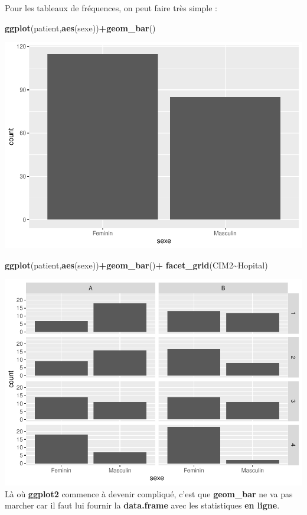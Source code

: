 \documentclass[
]{book}
\newenvironment{Shaded}{\begin{snugshade}}{\end{snugshade}}
\newcommand{\FunctionTok}[1]{\textcolor[rgb]{0.13,0.29,0.53}{\textbf{#1}}}
\newcommand{\NormalTok}[1]{#1}
\newcommand{\SpecialCharTok}[1]{\textcolor[rgb]{0.81,0.36,0.00}{\textbf{#1}}}
\begin{document}
Pour les tableaux de fréquences, on peut faire très simple :

\begin{Shaded}
\begin{Highlighting}[]
\FunctionTok{ggplot}\NormalTok{(patient,}\FunctionTok{aes}\NormalTok{(sexe))}\SpecialCharTok{+}\FunctionTok{geom\_bar}\NormalTok{()}
\end{Highlighting}
\end{Shaded}

\includegraphics{_main_files/figure-latex/ggplot17b-1.pdf}

\begin{Shaded}
\begin{Highlighting}[]
\FunctionTok{ggplot}\NormalTok{(patient,}\FunctionTok{aes}\NormalTok{(sexe))}\SpecialCharTok{+}\FunctionTok{geom\_bar}\NormalTok{()}\SpecialCharTok{+}
  \FunctionTok{facet\_grid}\NormalTok{(CIM2}\SpecialCharTok{\textasciitilde{}}\NormalTok{Hopital)}
\end{Highlighting}
\end{Shaded}

\includegraphics{_main_files/figure-latex/ggplot18b-1.pdf}
Là où \textbf{ggplot2} commence à devenir compliqué, c'est que \textbf{geom\_bar} ne va pas
marcher car il faut lui fournir la \textbf{data.frame} avec les statistiques \textbf{en ligne}.
\end{document}
